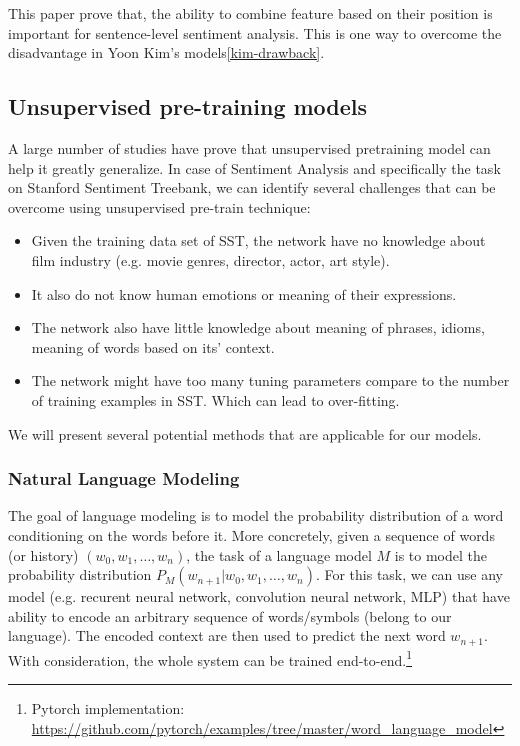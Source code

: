 This paper prove that, the ability to combine feature based on their position is important for sentence-level sentiment analysis. 
This is one way to overcome the disadvantage in Yoon Kim's models\ref{kim-drawback}.


\subsection{Unsupervised pre-training models}\label{sec:unsupervised-pretrain}
A large number of studies have prove that unsupervised pretraining model can help it greatly generalize\cite{why-unsupervised}\cite{greedy-layer}\cite{greedy-layer-bengio}\cite{pretrain-1}.
In case of Sentiment Analysis and specifically the task on Stanford Sentiment Treebank, we can identify several challenges that can be overcome using unsupervised pre-train technique\cite{why-unsupervised}:
\begin{itemize}
\item Given the training data set of SST, the network have no knowledge about film industry (e.g. movie genres, director, actor, art style). 
\item It also do not know human emotions or meaning of their expressions.
\item The network also have little knowledge about meaning of phrases, idioms, meaning of words based on its' context.
\item The network might have too many tuning parameters compare to the number of training examples in SST. 
Which can lead to over-fitting.
\end{itemize}
We will present several potential methods that are applicable for our models. 

\subsubsection{Natural Language Modeling}
The goal of language modeling is to model the probability distribution of a word conditioning on the words before it.
More concretely, given a sequence of words (or history) \((w_0, w_1,\ldots,w_n)\), the task of a language model \(M\) is to model the probability distribution \(P_M(w_{n+1}|w_0, w_1,\ldots,w_n)\). 
For this task, we can use any model (e.g. recurent neural network, convolution neural network, MLP) that have ability to encode an arbitrary sequence of words/symbols (belong to our language).
The encoded context are then used to predict the next word \(w_{n+1}\).
With consideration, the whole system can be trained end-to-end.\footnote{Pytorch implementation: \url{https://github.com/pytorch/examples/tree/master/word\_language\_model}}

